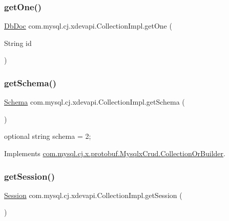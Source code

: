 \subsubsection{\texorpdfstring{get\+One()}{getOne()}}
{\footnotesize\ttfamily \mbox{\hyperlink{interfacecom_1_1mysql_1_1cj_1_1xdevapi_1_1_db_doc}{Db\+Doc}} com.\+mysql.\+cj.\+xdevapi.\+Collection\+Impl.\+get\+One (\begin{DoxyParamCaption}\item[{String}]{id }\end{DoxyParamCaption})}

\mbox{\label{classcom_1_1mysql_1_1cj_1_1xdevapi_1_1_collection_impl_a742cc33a72a7d2c8c8c88d0a5be7bc14}} 
\subsubsection{\texorpdfstring{get\+Schema()}{getSchema()}}
{\footnotesize\ttfamily \mbox{\hyperlink{interfacecom_1_1mysql_1_1cj_1_1xdevapi_1_1_schema}{Schema}} com.\+mysql.\+cj.\+xdevapi.\+Collection\+Impl.\+get\+Schema (\begin{DoxyParamCaption}{ }\end{DoxyParamCaption})}

{\ttfamily optional string schema = 2;} 

Implements \mbox{\hyperlink{interfacecom_1_1mysql_1_1cj_1_1x_1_1protobuf_1_1_mysqlx_crud_1_1_collection_or_builder_ab0b6bd32b4e0aa8766d5524d36027bf8}{com.\+mysql.\+cj.\+x.\+protobuf.\+Mysqlx\+Crud.\+Collection\+Or\+Builder}}.

\mbox{\label{classcom_1_1mysql_1_1cj_1_1xdevapi_1_1_collection_impl_aae4626274d39779ff51b26441b362eea}} 
\subsubsection{\texorpdfstring{get\+Session()}{getSession()}}
{\footnotesize\ttfamily \mbox{\hyperlink{interfacecom_1_1mysql_1_1cj_1_1xdevapi_1_1_session}{Session}} com.\+mysql.\+cj.\+xdevapi.\+Collection\+Impl.\+get\+Session (\begin{DoxyParamCaption}{ }\end{DoxyParamCaption})}

